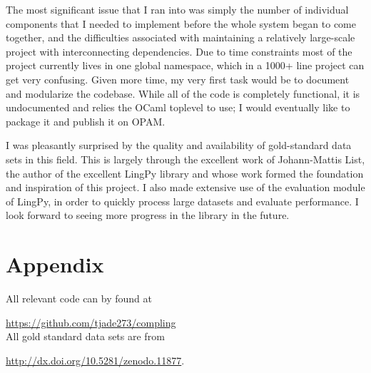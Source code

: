 \documentclass[doc,natbib,11pt]{apa6}
\begin{document}
The most significant issue that I ran into was simply the number of individual components that I needed to implement before the whole system began to come together, and the difficulties associated with maintaining a relatively large-scale project with interconnecting dependencies. Due to time constraints most of the project currently lives in one global namespace, which in a 1000+ line project can get very confusing. Given more time, my very first task would be to document and modularize the codebase. While all of the code is completely functional, it is undocumented and relies the OCaml toplevel to use; I would eventually like to package it and publish it on OPAM. 


I was pleasantly surprised by the quality and availability of gold-standard data sets in this field. This is largely through the excellent work of Johann-Mattis List, the author of the excellent LingPy library and whose work formed the foundation and inspiration of this project. I also made extensive use of the evaluation module of LingPy, in order to quickly process large datasets and evaluate performance. I look forward to seeing more progress in the library in the future.

\section{Appendix}

All relevant code can by found at 

\url{https://github.com/tjade273/compling}\\

All gold standard data sets are from 

\url{http://dx.doi.org/10.5281/zenodo.11877}.

\newpage
\begin{small} %
	\singlespacing %
	\thispagestyle{empty} %
\end{small} %
\end{document}
